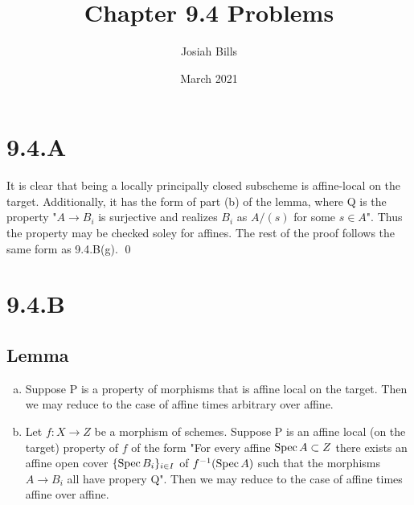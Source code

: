 \documentclass{article}
\title{Chapter 9.4 Problems}
\author{Josiah Bills}
\date{March 2021}
\begin{document}
\maketitle

\section{9.4.A}
It is clear that being a locally principally closed subscheme is affine-local
on the target. Additionally, it has the form of part (b) of the lemma, where Q
is the property "$A \to B_i$ is surjective and realizes
$B_i$ as $A/(s)$ for some
$s \in A$". Thus the property may be checked soley for affines.
The rest of the proof follows the same form as 9.4.B(g). \qed

\section{9.4.B}
\subsection{Lemma}
\begin{enumerate}[a.]
      \item Suppose P is a property of morphisms that is affine local on the target. Then
            we may reduce to the case of affine times arbitrary over affine.
      \item Let $f: X \to Z$ be a morphism of schemes. Suppose P is an affine
            local (on the target) property of $f$ of the form "For every
            affine $\operatorname{Spec} A \subset Z$ there exists an affine open cover
            $\{\operatorname{Spec} B_i\}_{i \in I}$ of $f^{-1}(\operatorname{Spec} A)$ such that the morphisms
            $A \to B_i$ all have propery Q". Then we may reduce to the case of
            affine times affine over affine.
\end{enumerate}
\end{document}
